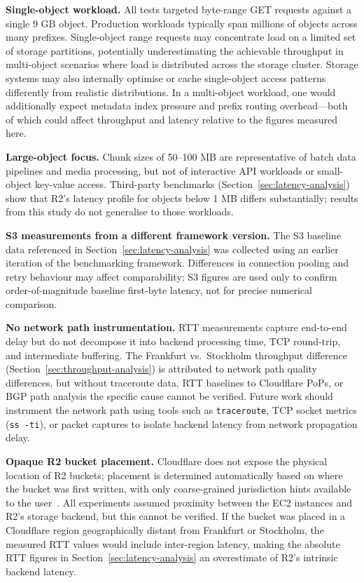 \textbf{Single-object workload.} All tests targeted byte-range GET requests against a single 9 GB object. Production workloads typically span millions of objects across many prefixes. Single-object range requests may concentrate load on a limited set of storage partitions, potentially underestimating the achievable throughput in multi-object scenarios where load is distributed across the storage cluster. Storage systems may also internally optimise or cache single-object access patterns differently from realistic distributions. In a multi-object workload, one would additionally expect metadata index pressure and prefix routing overhead---both of which could affect throughput and latency relative to the figures measured here.

\textbf{Large-object focus.} Chunk sizes of 50--100 MB are representative of batch data pipelines and media processing, but not of interactive API workloads or small-object key-value access. Third-party benchmarks (Section~\ref{sec:latency-analysis}) show that R2's latency profile for objects below 1 MB differs substantially; results from this study do not generalise to those workloads.

\textbf{S3 measurements from a different framework version.} The S3 baseline data referenced in Section~\ref{sec:latency-analysis} was collected using an earlier iteration of the benchmarking framework. Differences in connection pooling and retry behaviour may affect comparability; S3 figures are used only to confirm order-of-magnitude baseline first-byte latency, not for precise numerical comparison.

\textbf{No network path instrumentation.} RTT measurements capture end-to-end delay but do not decompose it into backend processing time, TCP round-trip, and intermediate buffering. The Frankfurt vs.\ Stockholm throughput difference (Section~\ref{sec:throughput-analysis}) is attributed to network path quality differences, but without traceroute data, RTT baselines to Cloudflare PoPs, or BGP path analysis the specific cause cannot be verified. Future work should instrument the network path using tools such as \texttt{traceroute}, TCP socket metrics (\texttt{ss -ti}), or packet captures to isolate backend latency from network propagation delay.

\textbf{Opaque R2 bucket placement.} Cloudflare does not expose the physical location of R2 buckets; placement is determined automatically based on where the bucket was first written, with only coarse-grained jurisdiction hints available to the user~\cite{kerkour2024s3r2}. All experiments assumed proximity between the EC2 instances and R2's storage backend, but this cannot be verified. If the bucket was placed in a Cloudflare region geographically distant from Frankfurt or Stockholm, the measured RTT values would include inter-region latency, making the absolute RTT figures in Section~\ref{sec:latency-analysis} an overestimate of R2's intrinsic backend latency.

